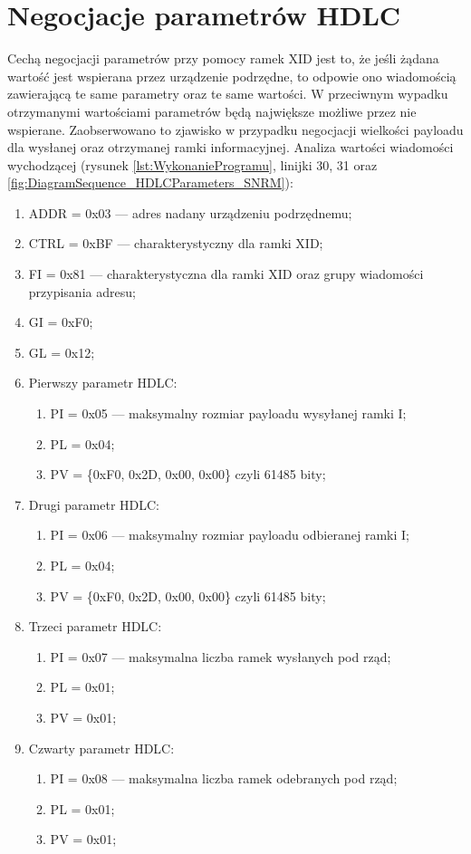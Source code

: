 \section{Negocjacje parametrów HDLC}
Cechą negocjacji parametrów przy pomocy ramek XID jest to, że jeśli żądana wartość jest wspierana przez
urządzenie podrzędne, to odpowie ono wiadomością zawierającą te same parametry oraz te same wartości. 
W przeciwnym wypadku otrzymanymi wartościami parametrów będą największe możliwe przez nie wspierane.
Zaobserwowano to zjawisko w przypadku negocjacji wielkości payloadu dla wysłanej oraz otrzymanej ramki informacyjnej.
\newline\newline
Analiza wartości wiadomości wychodzącej 
(rysunek \ref{lst:WykonanieProgramu}, linijki {30, 31} oraz \ref{fig:DiagramSequence_HDLCParameters_SNRM}):
\begin{enumerate}
    \item ADDR = 0x03 --- adres nadany urządzeniu podrzędnemu;
    \item CTRL = 0xBF --- charakterystyczny dla ramki XID;
    \item FI = 0x81 --- charakterystyczna dla ramki XID oraz grupy wiadomości przypisania adresu;
    \item GI = 0xF0;
    \item GL = 0x12;
    \item Pierwszy parametr HDLC:
    \begin{enumerate}
        \item PI = 0x05 --- maksymalny rozmiar payloadu wysyłanej ramki I;
        \item PL = 0x04;
        \item PV = \{0xF0, 0x2D, 0x00, 0x00\} czyli 61485 bity;
    \end{enumerate}
    \item Drugi parametr HDLC:
    \begin{enumerate}
        \item PI = 0x06 --- maksymalny rozmiar payloadu odbieranej ramki I;
        \item PL = 0x04;
        \item PV = \{0xF0, 0x2D, 0x00, 0x00\} czyli 61485 bity;
    \end{enumerate}
    \item Trzeci parametr HDLC:
    \begin{enumerate}
        \item PI = 0x07 --- maksymalna liczba ramek wysłanych pod rząd;
        \item PL = 0x01;
        \item PV = 0x01;
    \end{enumerate}
    \item Czwarty parametr HDLC:
    \begin{enumerate}
        \item PI = 0x08 --- maksymalna liczba ramek odebranych pod rząd;
        \item PL = 0x01;
        \item PV = 0x01;
    \end{enumerate}
\end{enumerate}
